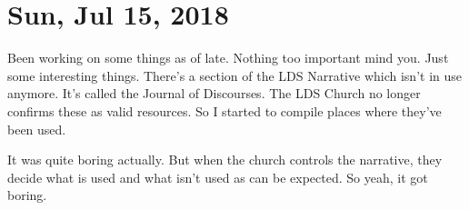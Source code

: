 \section{Sun, Jul 15, 2018}

Been working on some things as of late. Nothing too
important mind you. Just some interesting things. There's
a section of the LDS Narrative which isn't in use anymore.
It's called the Journal of Discourses. The LDS Church no
longer confirms these as valid resources. So I started to
compile places where they've been used.

It was quite boring actually. But when the church controls
the narrative, they decide what is used and what isn't used as
can be expected. So yeah, it got boring.